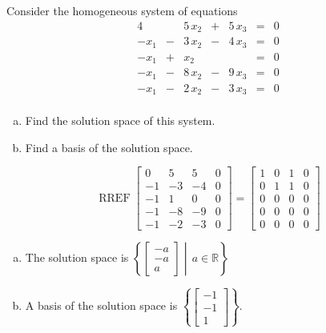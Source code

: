 
\begin{exerciseStatement}


Consider the homogeneous system of equations 
\begin{alignat*}{4}  & & 5 \, x_{2} &+& 5 \, x_{3} &=& 0 \\-x_{1} &-& 3 \, x_{2} &-& 4 \, x_{3} &=& 0 \\-x_{1} &+& x_{2} & &  &=& 0 \\-x_{1} &-& 8 \, x_{2} &-& 9 \, x_{3} &=& 0 \\-x_{1} &-& 2 \, x_{2} &-& 3 \, x_{3} &=& 0 \\ \end{alignat*}
            


\begin{enumerate}[(a)]
\item  Find the solution space of this system.
\item  Find a basis of the solution space.
\end{enumerate}
    
\end{exerciseStatement}
    
\begin{exerciseAnswer} 


\[\operatorname{RREF} \left[\begin{array}{ccc|c}
0 & 5 & 5 & 0 \\
-1 & -3 & -4 & 0 \\
-1 & 1 & 0 & 0 \\
-1 & -8 & -9 & 0 \\
-1 & -2 & -3 & 0
\end{array}\right] = \left[\begin{array}{ccc|c}
1 & 0 & 1 & 0 \\
0 & 1 & 1 & 0 \\
0 & 0 & 0 & 0 \\
0 & 0 & 0 & 0 \\
0 & 0 & 0 & 0
\end{array}\right] \]


\begin{enumerate}[(a)]
\item The solution space is \( \left\{ \left[\begin{array}{c}
-a \\
-a \\
a
\end{array}\right] \middle|\,a\in\mathbb{R}\right\} \)
\item A basis of the solution space is \( \left\{ \left[\begin{array}{c}
-1 \\
-1 \\
1
\end{array}\right] \right\} \).
\end{enumerate}
    
\end{exerciseAnswer}
    
